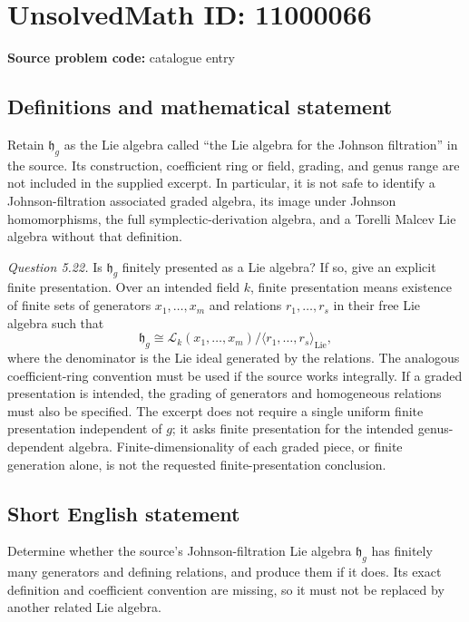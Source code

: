 \documentclass[11pt]{article}
\begin{document}
\section*{UnsolvedMath ID: 11000066}
\textbf{Source problem code:} catalogue entry
\subsection{Definitions and mathematical statement}
Retain \(\mathfrak h_g\) as the Lie algebra called ``the Lie algebra for the Johnson filtration'' in the source. Its construction, coefficient ring or field, grading, and genus range are not included in the supplied excerpt. In particular, it is not safe to identify a Johnson-filtration associated graded algebra, its image under Johnson homomorphisms, the full symplectic-derivation algebra, and a Torelli Malcev Lie algebra without that definition.

\emph{Question 5.22.} Is \(\mathfrak h_g\) finitely presented as a Lie algebra? If so, give an explicit finite presentation. Over an intended field \(k\), finite presentation means existence of finite sets of generators \(x_1,\ldots,x_m\) and relations \(r_1,\ldots,r_s\) in their free Lie algebra such that
\[
 \mathfrak h_g\cong
 \mathcal L_k(x_1,\ldots,x_m)/\langle r_1,\ldots,r_s\rangle_{\mathrm{Lie}},
\]
where the denominator is the Lie ideal generated by the relations. The analogous coefficient-ring convention must be used if the source works integrally. If a graded presentation is intended, the grading of generators and homogeneous relations must also be specified. The excerpt does not require a single uniform finite presentation independent of \(g\); it asks finite presentation for the intended genus-dependent algebra. Finite-dimensionality of each graded piece, or finite generation alone, is not the requested finite-presentation conclusion.
\subsection{Short English statement}
Determine whether the source's Johnson-filtration Lie algebra \(\mathfrak h_g\) has finitely many generators and defining relations, and produce them if it does. Its exact definition and coefficient convention are missing, so it must not be replaced by another related Lie algebra.
\end{document}
